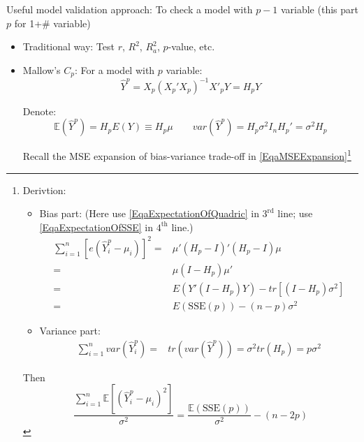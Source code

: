      Useful model validation approach: To check a model with $ p-1 $ variable (this part $ p $ for 1+\# variable)
        \begin{itemize}[topsep=2pt,itemsep=2pt]
        \item Traditional way: Test $ r $, $ R^2 $, $ R_a^2 $, $ p $-value, etc.
        \item Mallow's $ C_p $: For a model with $ p $ variable: 
        \begin{equation}
            \hat{Y}^p=X_p(X_p'X_p)^{-1}X'_pY=H_pY 
        \end{equation}
        
        Denote:
        \begin{equation}
            \mathbb{E}(\hat{Y}^p)=H_pE(Y)\equiv H_p\mu \qquad var(\hat{Y}^p)=H_p\sigma ^2I_nH_p'=\sigma ^2H_p
        \end{equation}

        Recall the MSE expansion of bias-variance trade-off in \autoref{EqaMSEExpansion}\footnote{Derivtion:
        \begin{itemize}[topsep=2pt,itemsep=0pt]
            \item Bias part: (Here use \autoref{EqaExpectationOfQuadric} in $ 3^\mathrm{rd} $ line; use \autoref{EqaExpectationOfSSE} in $ 4^\mathrm{th} $ line.)
            \begin{align*}
                \sum_{i=1}^n[e(\hat{Y}_i^p-\mu _i)]^2=&\mu'(H_p-I)'(H_p-I)\mu\\
                =&\mu (I-H_p)\mu '\\
                =&E(Y'(I-H_p)Y)-tr[(I-H_p)\sigma ^2]\\
                =&E(\mathrm{SSE}(p))-(n-p)\sigma ^2
            \end{align*}
            \item Variance part:
            \begin{align*}
                \sum_{i=1}^nvar(\hat{Y}_i^p)=& tr(var(\hat{Y}^p))=\sigma ^2tr(H_p)=p\sigma ^2
            \end{align*}
        \end{itemize}

        Then
        \begin{equation}
             \dfrac{\sum_{i=1}^n \mathbb{E}[(\hat{Y}_i^p-\mu_i)^2]}{\sigma ^2}=\dfrac{\mathbb{E}(\mathrm{SSE}(p) )}{\sigma ^2}-(n-2p)
        \end{equation}
            }


\end{itemize}

